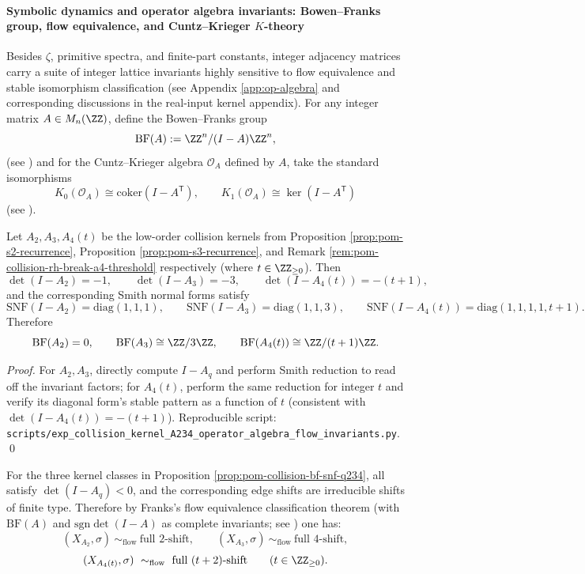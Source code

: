 \paragraph{Symbolic dynamics and operator algebra invariants: Bowen--Franks group, flow equivalence, and Cuntz--Krieger \texorpdfstring{$K$}{K}-theory}
Besides \(\zeta\), primitive spectra, and finite-part constants, integer adjacency matrices carry a suite of integer lattice invariants highly sensitive to flow equivalence and stable isomorphism classification (see Appendix \ref{app:op-algebra} and corresponding discussions in the real-input kernel appendix).
For any integer matrix \(A\in M_n(\ZZ)\), define the Bowen--Franks group
\[
\mathrm{BF}(A):=\ZZ^n/(I-A)\ZZ^n,
\]
(see \cite{BowenFranks1977HomologyZeroDim})
and for the Cuntz--Krieger algebra \(\mathcal O_A\) defined by \(A\), take the standard isomorphisms
\[
K_0(\mathcal O_A)\cong \mathrm{coker}(I-A^\mathsf T),\qquad
K_1(\mathcal O_A)\cong \ker(I-A^\mathsf T)
\]
(see \cite{CuntzKrieger1980}).

\begin{proposition}\label{prop:pom-collision-bf-snf-q234}
Let \(A_2,A_3,A_4(t)\) be the low-order collision kernels from Proposition \ref{prop:pom-s2-recurrence}, Proposition \ref{prop:pom-s3-recurrence}, and Remark \ref{rem:pom-collision-rh-break-a4-threshold} respectively (where \(t\in\ZZ_{\ge 0}\)).
Then
\[
\det(I-A_2)=-1,\qquad \det(I-A_3)=-3,\qquad \det(I-A_4(t))=-(t+1),
\]
and the corresponding Smith normal forms satisfy
\[
\mathrm{SNF}(I-A_2)=\mathrm{diag}(1,1,1),\qquad
\mathrm{SNF}(I-A_3)=\mathrm{diag}(1,1,3),\qquad
\mathrm{SNF}(I-A_4(t))=\mathrm{diag}(1,1,1,1,t+1).
\]
Therefore
\[
\mathrm{BF}(A_2)=0,\qquad
\mathrm{BF}(A_3)\cong \ZZ/3\ZZ,\qquad
\mathrm{BF}(A_4(t))\cong \ZZ/(t+1)\ZZ.
\]
\end{proposition}
\begin{proof}
For \(A_2,A_3\), directly compute \(I-A_q\) and perform Smith reduction to read off the invariant factors; for \(A_4(t)\), perform the same reduction for integer \(t\) and verify its diagonal form's stable pattern as a function of \(t\) (consistent with \(\det(I-A_4(t))=-(t+1)\)).
Reproducible script: \texttt{scripts/exp\_collision\_kernel\_A234\_operator\_algebra\_flow\_invariants.py}. \qed
\end{proof}

\begin{corollary}\label{cor:pom-collision-flow-equivalence-full-shift}
For the three kernel classes in Proposition \ref{prop:pom-collision-bf-snf-q234}, all satisfy \(\det(I-A_q)<0\), and the corresponding edge shifts are irreducible shifts of finite type.
Therefore by Franks's flow equivalence classification theorem (with \(\mathrm{BF}(A)\) and \(\mathrm{sgn}\det(I-A)\) as complete invariants; see \cite{Franks1984FlowEquivalenceSFT}) one has:
\[
(X_{A_2},\sigma)\ \sim_{\mathrm{flow}}\ \text{full }2\text{-shift},\qquad
(X_{A_3},\sigma)\ \sim_{\mathrm{flow}}\ \text{full }4\text{-shift},
\]
\[
(X_{A_4(t)},\sigma)\ \sim_{\mathrm{flow}}\ \text{full }(t+2)\text{-shift}\qquad(t\in\ZZ_{\ge 0}).
\]
\end{corollary}

